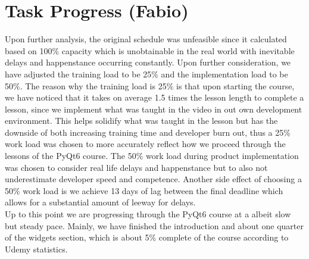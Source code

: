 \section{Task Progress (Fabio)}
Upon further analysis, the original schedule was unfeasible since it calculated based on 100\% capacity which is unobtainable in the real world with inevitable delays and happenstance occurring constantly. Upon further consideration, we have adjusted the training load to be 25\% and the implementation load to be 50\%. The reason why the training load is 25\% is that upon starting the course, we have noticed that it takes on average 1.5 times the lesson length to complete a lesson, since we implement what was taught in the video in out own development environment. This helps solidify what was taught in the lesson but has the downside of both increasing training time and developer burn out, thus a 25\% work load was chosen to more accurately reflect how we proceed through the lessons of the PyQt6 course. The 50\% work load during product implementation was chosen to consider real life delays and happenstance but to also not underestimate developer speed and competence. Another side effect of choosing a 50\% work load is we achieve 13 days of lag between the final deadline which allows for a substantial amount of leeway for delays.\\
Up to this point we are progressing through the PyQt6 course at a albeit slow but steady pace. Mainly, we have finished the introduction and about one quarter of the widgets section, which is about 5\% complete of the course according to Udemy statistics.